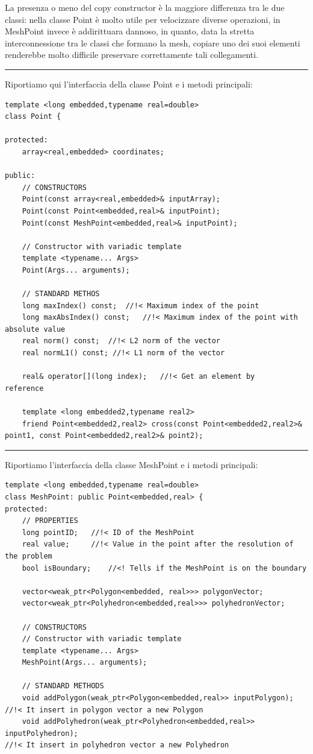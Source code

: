 \documentclass[oneside,12pt]{book}  %
\theoremstyle{plain}
\theoremstyle{definition}
\theoremstyle{remark}
\numberwithin{equation}{chapter} %
\begin{document}
La presenza o meno del copy constructor \`e la maggiore differenza tra
le due classi: nella classe Point \`e molto utile per velocizzare
diverse operazioni, in MeshPoint invece \`e addirittuara dannoso, in
quanto, data la stretta interconnessione tra le classi che formano la
mesh, copiare uno dei suoi elementi renderebbe molto difficile
preservare correttamente tali collegamenti.

\noindent\rule{14cm}{1pt}

Riportiamo qui l'interfaccia della classe Point e i metodi principali:

\begin{verbatim}
template <long embedded,typename real=double>
class Point {

protected:
    array<real,embedded> coordinates;

public:
    // CONSTRUCTORS
    Point(const array<real,embedded>& inputArray);
    Point(const Point<embedded,real>& inputPoint);
    Point(const MeshPoint<embedded,real>& inputPoint);

    // Constructor with variadic template
    template <typename... Args>
    Point(Args... arguments);

    // STANDARD METHOS
    long maxIndex() const;	//!< Maximum index of the point
    long maxAbsIndex() const;	//!< Maximum index of the point with absolute value
    real norm() const;  //!< L2 norm of the vector
    real normL1() const; //!< L1 norm of the vector

    real& operator[](long index);	//!< Get an element by
reference

    template <long embedded2,typename real2>
    friend Point<embedded2,real2> cross(const Point<embedded2,real2>&
point1, const Point<embedded2,real2>& point2);
\end{verbatim}

\noindent\rule{14cm}{1pt}

Riportiamo l'interfaccia della classe MeshPoint e i metodi principali:

\begin{verbatim}
template <long embedded,typename real=double>
class MeshPoint: public Point<embedded,real> {
protected:
    // PROPERTIES
    long pointID;	//!< ID of the MeshPoint
    real value;		//!< Value in the point after the resolution of the problem
    bool isBoundary;	//<! Tells if the MeshPoint is on the boundary

    vector<weak_ptr<Polygon<embedded, real>>> polygonVector;
    vector<weak_ptr<Polyhedron<embedded,real>>> polyhedronVector;

    // CONSTRUCTORS
    // Constructor with variadic template
    template <typename... Args>
    MeshPoint(Args... arguments);

    // STANDARD METHODS
    void addPolygon(weak_ptr<Polygon<embedded,real>> inputPolygon); 
//!< It insert in polygon vector a new Polygon
    void addPolyhedron(weak_ptr<Polyhedron<embedded,real>> inputPolyhedron);	
//!< It insert in polyhedron vector a new Polyhedron


\end{verbatim}
\end{document}

